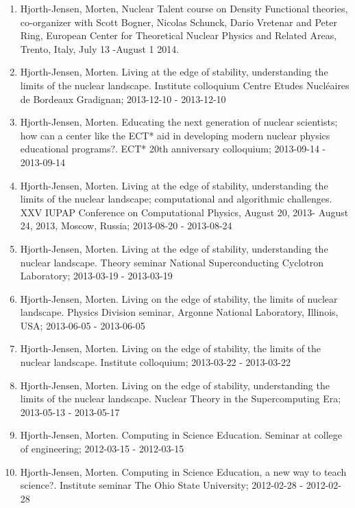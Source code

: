 \documentclass[a4wide,10pt]{article}
\begin{document}
\begin{enumerate}
\item Hjorth-Jensen, Morten, Nuclear Talent course on Density Functional theories, co-organizer with Scott Bogner, Nicolas Schunck, Dario Vretenar and Peter Ring, European Center for Theoretical Nuclear Physics and Related Areas, Trento, Italy, July 13 -August 1 2014.

\item Hjorth-Jensen, Morten.  Living at the edge of stability, understanding the limits of the nuclear landscape. Institute colloquium Centre Etudes Nucléaires de Bordeaux Gradignan; 2013-12-10 - 2013-12-10

\item Hjorth-Jensen, Morten.  Educating the next generation of nuclear scientists; how can a center like the ECT* aid in developing modern nuclear physics educational programs?. ECT* 20th anniversary colloquium; 2013-09-14 - 2013-09-14

\item Hjorth-Jensen, Morten.  Living at the edge of stability, understanding the limits of the nuclear landscape; computational and algorithmic challenges. XXV IUPAP Conference on Computational Physics, August 20, 2013- August 24, 2013, Moscow, Russia; 2013-08-20 - 2013-08-24

\item Hjorth-Jensen, Morten.  Living at the edge of stability, understanding the nuclear landscape. Theory seminar National Superconducting Cyclotron Laboratory; 2013-03-19 - 2013-03-19

\item Hjorth-Jensen, Morten.  Living on the edge of stability, the limits of nuclear landscape. Physics Division seminar, Argonne National Laboratory, Illinois, USA; 2013-06-05 - 2013-06-05

\item Hjorth-Jensen, Morten.  Living on the edge of stability, the limits of the nuclear landscape. Institute colloquium; 2013-03-22 - 2013-03-22

\item Hjorth-Jensen, Morten.  Living on the edge of stability, understanding the limits of the nuclear landscape. Nuclear Theory in the Supercomputing Era; 2013-05-13 - 2013-05-17

\item Hjorth-Jensen, Morten.  Computing in Science Education. Seminar at college of engineering; 2012-03-15 - 2012-03-15

\item Hjorth-Jensen, Morten.  Computing in Science Education, a new way to teach science?. Institute seminar The Ohio State University; 2012-02-28 - 2012-02-28


\end{enumerate}
\end{document}
